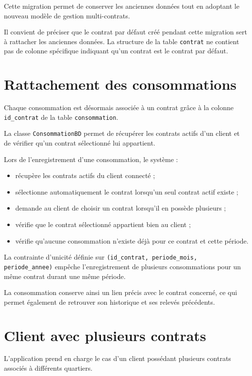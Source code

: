 Cette migration permet de conserver les anciennes données tout en adoptant le nouveau modèle de gestion multi-contrats.

Il convient de préciser que le contrat par défaut créé pendant cette migration sert à rattacher les anciennes données. La structure de la table \texttt{contrat} ne contient pas de colonne spécifique indiquant qu'un contrat est le contrat par défaut.

\section{Rattachement des consommations}

Chaque consommation est désormais associée à un contrat grâce à la colonne \texttt{id\_contrat} de la table \texttt{consommation}.

La classe \texttt{ConsommationBD} permet de récupérer les contrats actifs d'un client et de vérifier qu'un contrat sélectionné lui appartient.

Lors de l'enregistrement d'une consommation, le système :
\begin{itemize}
    \item récupère les contrats actifs du client connecté ;
    \item sélectionne automatiquement le contrat lorsqu'un seul contrat actif existe ;
    \item demande au client de choisir un contrat lorsqu'il en possède plusieurs ;
    \item vérifie que le contrat sélectionné appartient bien au client ;
    \item vérifie qu'aucune consommation n'existe déjà pour ce contrat et cette période.
\end{itemize}

La contrainte d'unicité définie sur
\texttt{(id\_contrat, periode\_mois, periode\_annee)}
empêche l'enregistrement de plusieurs consommations pour un même contrat durant une même période.

La consommation conserve ainsi un lien précis avec le contrat concerné, ce qui permet également de retrouver son historique et ses relevés précédents.

\section{Client avec plusieurs contrats}

L'application prend en charge le cas d'un client possédant plusieurs contrats associés à différents quartiers.


